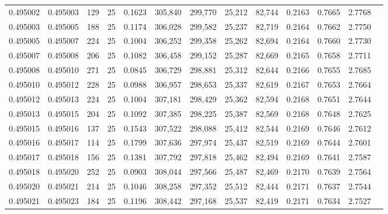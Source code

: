 \begin{tabular}{rrrrrrrrrrrrr}
0.495002 & 0.495003 &   129 &  25 &                                     0.1623 & 305,840 & 299,770 &  25,212 &  82,744 & 0.2163 & 0.7665 & 2.7768 \\
0.495003 & 0.495005 &   188 &  25 &                                     0.1174 & 306,028 & 299,582 &  25,237 &  82,719 & 0.2164 & 0.7662 & 2.7750 \\
0.495005 & 0.495007 &   224 &  25 &                                     0.1004 & 306,252 & 299,358 &  25,262 &  82,694 & 0.2164 & 0.7660 & 2.7730 \\
0.495007 & 0.495008 &   206 &  25 &                                     0.1082 & 306,458 & 299,152 &  25,287 &  82,669 & 0.2165 & 0.7658 & 2.7711 \\
0.495008 & 0.495010 &   271 &  25 &                                     0.0845 & 306,729 & 298,881 &  25,312 &  82,644 & 0.2166 & 0.7655 & 2.7685 \\
0.495010 & 0.495012 &   228 &  25 &                                     0.0988 & 306,957 & 298,653 &  25,337 &  82,619 & 0.2167 & 0.7653 & 2.7664 \\
0.495012 & 0.495013 &   224 &  25 &                                     0.1004 & 307,181 & 298,429 &  25,362 &  82,594 & 0.2168 & 0.7651 & 2.7644 \\
0.495013 & 0.495015 &   204 &  25 &                                     0.1092 & 307,385 & 298,225 &  25,387 &  82,569 & 0.2168 & 0.7648 & 2.7625 \\
0.495015 & 0.495016 &   137 &  25 &                                     0.1543 & 307,522 & 298,088 &  25,412 &  82,544 & 0.2169 & 0.7646 & 2.7612 \\
0.495016 & 0.495017 &   114 &  25 &                                     0.1799 & 307,636 & 297,974 &  25,437 &  82,519 & 0.2169 & 0.7644 & 2.7601 \\
0.495017 & 0.495018 &   156 &  25 &                                     0.1381 & 307,792 & 297,818 &  25,462 &  82,494 & 0.2169 & 0.7641 & 2.7587 \\
0.495018 & 0.495020 &   252 &  25 &                                     0.0903 & 308,044 & 297,566 &  25,487 &  82,469 & 0.2170 & 0.7639 & 2.7564 \\
0.495020 & 0.495021 &   214 &  25 &                                     0.1046 & 308,258 & 297,352 &  25,512 &  82,444 & 0.2171 & 0.7637 & 2.7544 \\
0.495021 & 0.495023 &   184 &  25 &                                     0.1196 & 308,442 & 297,168 &  25,537 &  82,419 & 0.2171 & 0.7634 & 2.7527 \\

\end{tabular}
